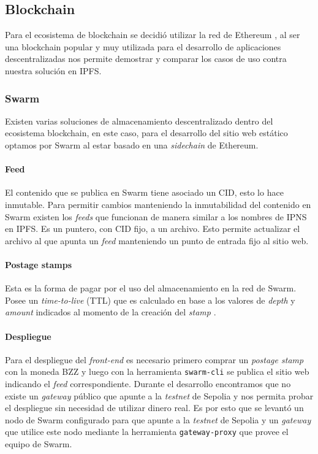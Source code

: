 \subsection{Blockchain}

Para el ecosistema de blockchain se decidió utilizar la red de Ethereum \cite{wood2014ethereum}, al ser una blockchain popular y muy utilizada para el desarrollo de aplicaciones descentralizadas nos permite demostrar y comparar los casos de uso contra nuestra solución en IPFS.

\subsubsection{Swarm}

Existen varias soluciones de almacenamiento descentralizado dentro del ecosistema blockchain, en este caso, para el desarrollo del sitio web estático optamos por Swarm al estar basado en una \textit{sidechain} de Ethereum.

\paragraph{Feed} El contenido que se publica en Swarm tiene asociado un CID, esto lo hace inmutable. Para permitir cambios manteniendo la inmutabilidad del contenido en Swarm existen los \textit{feeds} que funcionan de manera similar a los nombres de IPNS en IPFS. Es un puntero, con CID fijo, a un archivo. Esto permite actualizar el archivo al que apunta un \textit{feed} manteniendo un punto de entrada fijo al sitio web.

\paragraph{Postage stamps} Esta es la forma de pagar por el uso del almacenamiento en la red de Swarm. Posee un \textit{time-to-live} (TTL) que es calculado en base a los valores de \textit{depth} y \textit{amount} indicados al momento de la creación del \textit{stamp} \cite{swarm-postage-stamps}.

\paragraph{Despliegue} Para el despliegue del \textit{front-end} es necesario primero comprar un \textit{postage stamp} con la moneda BZZ y luego con la herramienta \texttt{swarm-cli} \cite{swarm-cli} se publica el sitio web indicando el \textit{feed} correspondiente. Durante el desarrollo encontramos que no existe un \textit{gateway} público que apunte a la \textit{testnet} de Sepolia y nos permita probar el despliegue sin necesidad de utilizar dinero real. Es por esto que se levantó un nodo de Swarm configurado para que apunte a la \textit{testnet} de Sepolia y un \textit{gateway} que utilice este nodo mediante la herramienta \texttt{gateway-proxy} \cite{gateway-proxy} que provee el equipo de Swarm.

